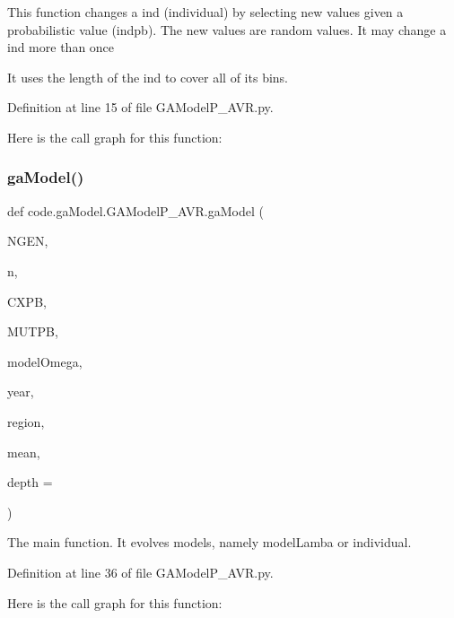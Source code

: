 \begin{DoxyVerb}This function changes a ind (individual) by selecting new values given a probabilistic value (indpb).
The new values are random values. It may change a ind more than once

It uses the length of the ind to cover all of its bins.
\end{DoxyVerb}
 

Definition at line 15 of file G\+A\+Model\+P\+\_\+\+A\+V\+R.\+py.

Here is the call graph for this function\+:
\mbox{\label{namespacecode_1_1ga_model_1_1_g_a_model_p___a_v_r_a54a6aa539f4e7f9dd54b74a1a808662f}} 
\subsubsection{\texorpdfstring{ga\+Model()}{gaModel()}}
{\footnotesize\ttfamily def code.\+ga\+Model.\+G\+A\+Model\+P\+\_\+\+A\+V\+R.\+ga\+Model (\begin{DoxyParamCaption}\item[{}]{N\+G\+EN,  }\item[{}]{n,  }\item[{}]{C\+X\+PB,  }\item[{}]{M\+U\+T\+PB,  }\item[{}]{model\+Omega,  }\item[{}]{year,  }\item[{}]{region,  }\item[{}]{mean,  }\item[{}]{depth = {} }\end{DoxyParamCaption})}

\begin{DoxyVerb}The main function. It evolves models, namely modelLamba or individual. 
\end{DoxyVerb}
 

Definition at line 36 of file G\+A\+Model\+P\+\_\+\+A\+V\+R.\+py.

Here is the call graph for this function\+:

